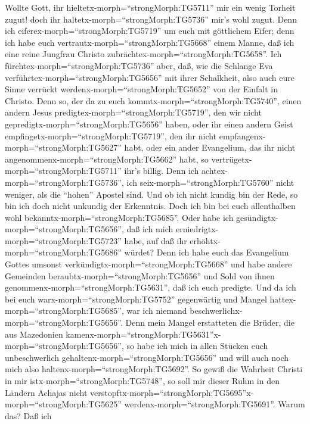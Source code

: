  Wollte Gott, ihr hieltetx-morph=``strongMorph:TG5711'' mir
ein wenig Torheit zugut! doch ihr haltetx-morph=``strongMorph:TG5736''
mir's wohl zugut.  Denn ich
eiferex-morph=``strongMorph:TG5719'' um euch mit göttlichem Eifer; denn
ich habe euch vertrautx-morph=``strongMorph:TG5668'' einem Manne, daß
ich eine reine Jungfrau Christo zubrächtex-morph=``strongMorph:TG5658''.
 Ich fürchtex-morph=``strongMorph:TG5736'' aber, daß, wie
die Schlange Eva verführtex-morph=``strongMorph:TG5656'' mit ihrer
Schalkheit, also auch eure Sinne verrückt
werdenx-morph=``strongMorph:TG5652'' von der Einfalt in Christo.
 Denn so, der da zu euch
kommtx-morph=``strongMorph:TG5740'', einen andern Jesus
predigtex-morph=``strongMorph:TG5719'', den wir nicht
gepredigtx-morph=``strongMorph:TG5656'' haben, oder ihr einen andern
Geist empfingetx-morph=``strongMorph:TG5719'', den ihr nicht
empfangenx-morph=``strongMorph:TG5627'' habt, oder ein ander Evangelium,
das ihr nicht angenommenx-morph=``strongMorph:TG5662'' habt, so
vertrügetx-morph=``strongMorph:TG5711'' ihr's billig.  Denn
ich achtex-morph=``strongMorph:TG5736'', ich
seix-morph=``strongMorph:TG5760'' nicht weniger, als die ``hohen''
Apostel sind.  Und ob ich nicht kundig bin der Rede, so bin
ich doch nicht unkundig der Erkenntnis. Doch ich bin bei euch
allenthalben wohl bekanntx-morph=``strongMorph:TG5685''. 
Oder habe ich gesündigtx-morph=``strongMorph:TG5656'', daß ich mich
erniedrigtx-morph=``strongMorph:TG5723'' habe, auf daß ihr
erhöhtx-morph=``strongMorph:TG5686'' würdet? Denn ich habe euch das
Evangelium Gottes umsonst verkündigtx-morph=``strongMorph:TG5668''
 und habe andere Gemeinden
beraubtx-morph=``strongMorph:TG5656'' und Sold von ihnen
genommenx-morph=``strongMorph:TG5631'', daß ich euch predigte.
 Und da ich bei euch warx-morph=``strongMorph:TG5752''
gegenwärtig und Mangel hattex-morph=``strongMorph:TG5685'', war ich
niemand beschwerlichx-morph=``strongMorph:TG5656''. Denn mein Mangel
erstatteten die Brüder, die aus Mazedonien
kamenx-morph=``strongMorph:TG5631''x-morph=``strongMorph:TG5656'', so
habe ich mich in allen Stücken euch unbeschwerlich
gehaltenx-morph=``strongMorph:TG5656'' und will auch noch mich also
haltenx-morph=``strongMorph:TG5692''.  So gewiß die
Wahrheit Christi in mir istx-morph=``strongMorph:TG5748'', so soll mir
dieser Ruhm in den Ländern Achajas nicht
verstopftx-morph=``strongMorph:TG5695''\textbar x-morph=``strongMorph:TG5625''
werdenx-morph=``strongMorph:TG5691''.  Warum das? Daß ich
